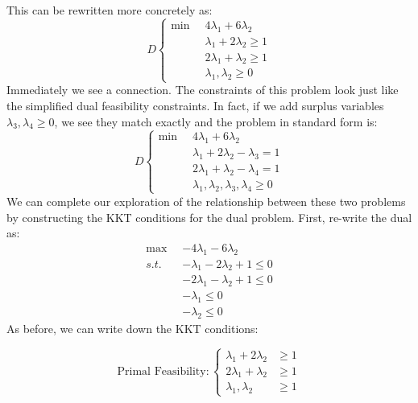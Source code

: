 This can be rewritten more concretely as:
\begin{equation}
D\left\{
\begin{aligned}
\min \;\; & 4\lambda_1 + 6\lambda_2\\
&\lambda_1 + 2\lambda_2 \geq 1\\
&2\lambda_1 + \lambda_2 \geq 1\\
& \lambda_1, \lambda_2 \geq 0
\end{aligned}
\right.
\end{equation}
Immediately we see a connection. The constraints of this problem look just like the simplified dual feasibility constraints. In fact, if we add surplus variables $\lambda_3, \lambda_4 \geq 0$, we see they match exactly and the problem in standard form is:
\begin{equation}
D\left\{
\begin{aligned}
\min \;\; & 4\lambda_1 + 6\lambda_2\\
&\lambda_1 + 2\lambda_2 - \lambda_3 = 1\\
&2\lambda_1 + \lambda_2 -\lambda_4 =1\\
& \lambda_1, \lambda_2,\lambda_3, \lambda_4 \geq 0
\end{aligned}
\right.
\end{equation}
We can complete our exploration of the relationship between these two problems by constructing the KKT conditions for the dual problem. First, re-write the dual as:
\begin{equation}
\begin{aligned}
\max\;\; & -4\lambda_1 - 6\lambda_2 \\
s.t. & -\lambda_1 - 2\lambda_2 + 1\leq 0\\
& -2\lambda_1 - \lambda_2 + 1\leq 0\\
& -\lambda_1 \leq 0\\
& -\lambda_2 \leq 0
\end{aligned}
\end{equation}
As before, we can write down the KKT conditions:

$$\text{Primal Feasibility}: \left\{
\begin{aligned}
\lambda_1 + 2\lambda_2 &\geq 1\\
2\lambda_1 + \lambda_2 &\geq 1\\
\lambda_1, \lambda_2 & \geq 1
\end{aligned}
\right.$$


